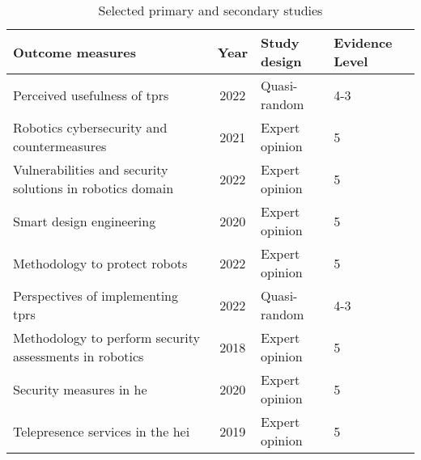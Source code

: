 \begin{table}[h!]
\centering
\smaller
\caption{Selected primary and secondary studies}
\label{tab:studies}
\begin{tabularx}{\columnwidth}{lcll}
\toprule
\textbf{Outcome measures}                                                                       & \textbf{Year} & \textbf{Study design} & \textbf{Evidence Level} \\
\midrule
Perceived usefulness of \ac{tprs}~\cite[]{acceptance-telepresence-robots-2022}                  & 2022          & Quasi-random          & 4-3                     \\
Robotics cybersecurity and countermeasures~\cite[]{cyber_security_issues_in_robotics_2021}                                     & 2021          & Expert opinion        & 5                       \\
Vulnerabilities and security solutions in robotics domain~\cite[]{robotics_cyber_security_2022}                                  & 2022& Expert opinion& 5                       \\
Smart design engineering~\cite[]{smart_design_engineering_2020}                                 & 2020          & Expert opinion& 5                       \\
Methodology to protect robots~\cite[]{robot_security_review_2022}                               & 2022          & Expert opinion& 5                       \\
Perspectives of implementing \ac{tprs}~\cite[]{higher_edu_perception_on_tprs_2022}                                                         & 2022          & Quasi-random          & 4-3                     \\
Methodology to perform security assessments in robotics~\cite[]{robot_security_framework_2018}                                         & 2018          & Expert opinion& 5                       \\
Security measures in \ac{he}~\cite[]{role_of_cyber_security_in_higher_edu_2020}                 & 2020          & Expert opinion& 5                       \\
Telepresence services in the \ac{hei}~\cite[]{telepresence_robots_in_classroom_2019}                                                           & 2019          & Expert opinion& 5                       \\
\bottomrule
\end{tabularx}
\end{table}



